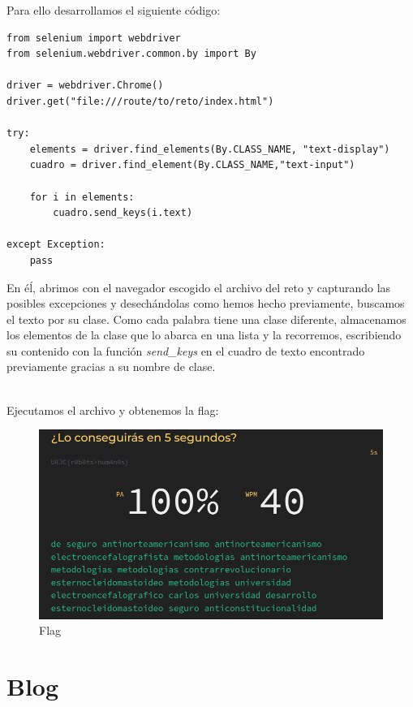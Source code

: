 \documentclass[12pt, a4paper,twoside,titlepage]{article}
\begin{document}
Para ello desarrollamos el siguiente código:

\begin{verbatim}
from selenium import webdriver
from selenium.webdriver.common.by import By

driver = webdriver.Chrome()
driver.get("file:///route/to/reto/index.html")

try:
    elements = driver.find_elements(By.CLASS_NAME, "text-display")
    cuadro = driver.find_element(By.CLASS_NAME,"text-input")

    for i in elements:
        cuadro.send_keys(i.text)

except Exception:
    pass
\end{verbatim}

En éĺ, abrimos con el navegador escogido el archivo del reto y capturando las posibles excepciones y desechándolas como hemos hecho previamente, buscamos el texto por su clase. Como cada palabra tiene una clase diferente, almacenamos los elementos de la clase que lo abarca en una lista y la recorremos, escribiendo su contenido con la función \emph{send\_keys} en el cuadro de texto encontrado previamente gracias a su nombre de clase.

\\

Ejecutamos el archivo y obtenemos la flag:

\begin{figure}[H]
    \centering
    \includegraphics[width=1\linewidth]{Figuras/10FastFingers/FlagSel.png}
    \caption{Flag}
    \label{fig:my_label}
\end{figure}

\newpage

\section{Blog}
\end{document}
